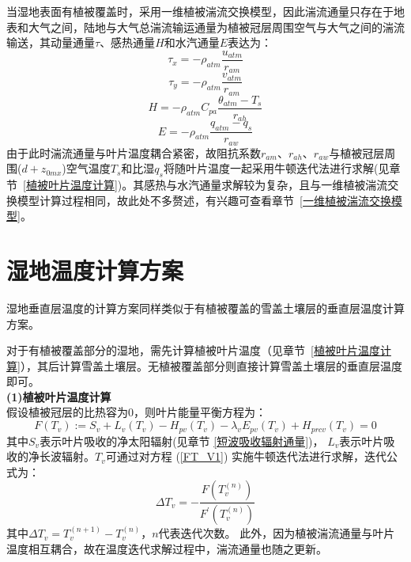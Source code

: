 当湿地表面有植被覆盖时，采用一维植被湍流交换模型，因此湍流通量只存在于地表和大气之间，陆地与大气总湍流输运通量为植被冠层周围空气与大气之间的湍流输送，其动量通量$\tau$、感热通量$H$和水汽通量$E$表达为：
\begin{equation}
\tau_{x}=-\rho_{atm} \frac{u_{atm}}{r_{a m}}
\end{equation}
\begin{equation}
\tau_{y}=-\rho_{atm} \frac{v_{atm}}{r_{a m}}
\end{equation}
\begin{equation}
H=-\rho_{atm} C_{p a} \frac{\theta_{atm}-T_{s}}{r_{a h}}
\end{equation}
\begin{equation}
E=-\rho_{atm} \frac{q_{atm}-q_{s}}{r_{a w}}
\end{equation}
由于此时湍流通量与叶片温度耦合紧密，故阻抗系数$r_{am}$、$r_{ah}$、$r_{aw}$与植被冠层周围($d+z_{0mx}$)空气温度$T_s$和比湿$q_s$将随叶片温度一起采用牛顿迭代法进行求解(见章节~\ref{植被叶片温度计算})。其感热与水汽通量求解较为复杂，且与一维植被湍流交换模型计算过程相同，故此处不多赘述，有兴趣可查看章节~\ref{一维植被湍流交换模型}。

\section{湿地温度计算方案}
湿地垂直层温度的计算方案同样类似于有植被覆盖的雪盖土壤层的垂直层温度计算方案。

对于有植被覆盖部分的湿地，需先计算植被叶片温度（见章节~\ref{植被叶片温度计算}），其后计算雪盖土壤层。无植被覆盖部分则直接计算雪盖土壤层的垂直层温度即可。\\

\textbf {(1)植被叶片温度计算}\\

假设植被冠层的比热容为0，则叶片能量平衡方程为：
\begin{equation}\label{FT_V1}
F\left(T_{v}\right):=S_{v}+L_{v}\left(T_{v}\right)-H_{p v}\left(T_{v}\right)-\lambda_{v} E_{p v}\left(T_{v}\right)+H_{p r c v}\left(T_{v}\right)=0
\end{equation}
其中$S_v$表示叶片吸收的净太阳辐射(见章节 \ref{短波吸收辐射通量})，
$L_v$表示叶片吸收的净长波辐射。$T_v$可通过对方程 (\ref{FT_V1}) 实施牛顿迭代法进行求解，迭代公式为：
\begin{equation}
\Delta T_{v}=-\frac{F\left(T_{v}^{(n)}\right)}{F^{\prime}\left(T_{v}^{(n)}\right)}
\end{equation}
其中$\Delta T_v=T_v^{\left(n+1\right)}-T_v^{\left(n\right)}$，$n$代表迭代次数。
此外，因为植被湍流通量与叶片温度相互耦合，故在温度迭代求解过程中，湍流通量也随之更新。

